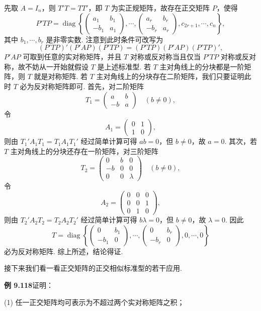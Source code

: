 \documentclass[UTF8, 12pt, fontset=fandol, oneside]{ctexart}
\begin{document}
先取 $A=I_n$，则 $T'T=TT'$，即 $T$ 为实正规矩阵，故存在正交矩阵 $P$，使得
\[
P'TP=\operatorname{diag}\left\{
\begin{pmatrix}
a_1&b_1\\
-b_1&a_1
\end{pmatrix},\cdots,
\begin{pmatrix}
a_r&b_r\\
-b_r&a_r
\end{pmatrix},
c_{2r+1},\cdots,c_n
\right\},
\]
其中 $b_1,\cdots,b_r$ 是非零实数. 注意到此时条件可改写为
\[
(P'TP)'(P'AP)(P'TP)=(P'TP)(P'AP)(P'TP)',
\]
$P'AP$ 可取到任意的实对称矩阵，并且 $T$ 对称或反对称当且仅当 $P'TP$ 对称或反对称，故不妨从一开始就假设 $T$ 是上述标准型. 若 $T$ 主对角线上的分块都是一阶矩阵，则 $T$ 就是对称矩阵. 若 $T$ 主对角线上的分块存在二阶矩阵，我们只要证明此时 $T$ 必为反对称矩阵即可. 首先，对二阶矩阵
\[
T_1=\begin{pmatrix}
a&b\\
-b&a
\end{pmatrix}\quad (b\ne0),
\]
令
\[
A_1=\begin{pmatrix}
0&1\\
1&0
\end{pmatrix},
\]
则由 $T_1'A_1T_1=T_1A_1T_1'$ 经过简单计算可得 $ab=0$，但 $b\ne0$，故 $a=0$. 其次，若 $T$ 主对角线上的分块还存在一阶矩阵，对三阶矩阵
\[
T_2=\begin{pmatrix}
0&b&0\\
-b&0&0\\
0&0&\lambda
\end{pmatrix}\quad (b\ne0),
\]
令
\[
A_2=\begin{pmatrix}
0&0&0\\
0&0&1\\
0&1&0
\end{pmatrix},
\]
则由 $T_2'A_2T_2=T_2A_2T_2'$ 经过简单计算可得 $b\lambda=0$，但 $b\ne0$，故 $\lambda=0$. 因此
\[
T=\operatorname{diag}\left\{
\begin{pmatrix}
0&b_1\\
-b_1&0
\end{pmatrix},\cdots,
\begin{pmatrix}
0&b_r\\
-b_r&0
\end{pmatrix},
0,\cdots,0
\right\}
\]
必为反对称矩阵. 综上所述，结论得证.

接下来我们看一看正交矩阵的正交相似标准型的若干应用.

\noindent\textbf{例 9.118}\quad 证明：

(1) 任一正交矩阵均可表示为不超过两个实对称矩阵之积；
\end{document}
